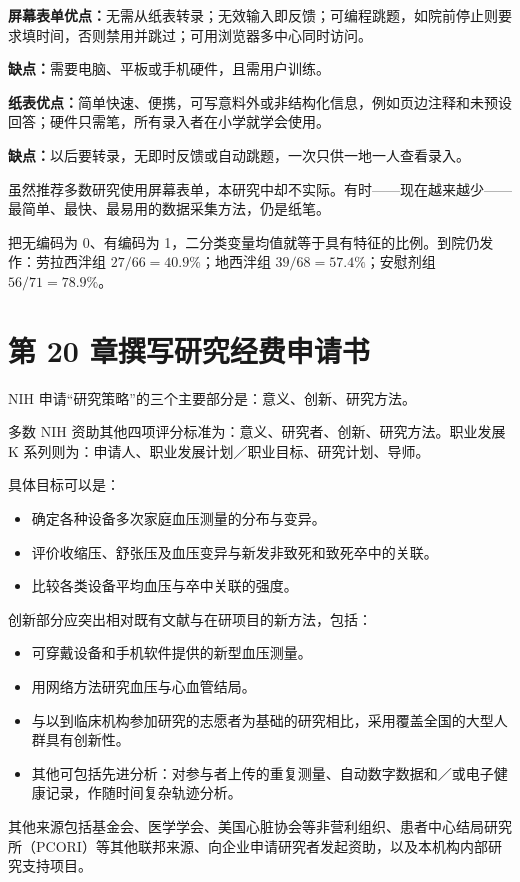 \begin{answerlist}
\item[1c.] \textbf{屏幕表单优点：}无需从纸表转录；无效输入即反馈；可编程跳题，如院前停止则要求填时间，否则禁用并跳过；可用浏览器多中心同时访问。

\textbf{缺点：}需要电脑、平板或手机硬件，且需用户训练。

\textbf{纸表优点：}简单快速、便携，可写意料外或非结构化信息，例如页边注释和未预设回答；硬件只需笔，所有录入者在小学就学会使用。

\textbf{缺点：}以后要转录，无即时反馈或自动跳题，一次只供一地一人查看录入。

虽然推荐多数研究使用屏幕表单，本研究中却不实际。有时——现在越来越少——最简单、最快、最易用的数据采集方法，仍是纸笔。
\item[2.] 把无编码为 0、有编码为 1，二分类变量均值就等于具有特征的比例。到院仍发作：劳拉西泮组 $27/66=40.9\%$；地西泮组 $39/68=57.4\%$；安慰剂组 $56/71=78.9\%$。
\end{answerlist}

\section{第 20 章\quad 撰写研究经费申请书}
\begin{answerlist}
\item[1.] NIH 申请“研究策略”的三个主要部分是：意义、创新、研究方法。
\item[2.] 多数 NIH 资助其他四项评分标准为：意义、研究者、创新、研究方法。职业发展 K 系列则为：申请人、职业发展计划／职业目标、研究计划、导师。
\item[3a.] 具体目标可以是：
\begin{itemize}
\item 确定各种设备多次家庭血压测量的分布与变异。
\item 评价收缩压、舒张压及血压变异与新发非致死和致死卒中的关联。
\item 比较各类设备平均血压与卒中关联的强度。
\end{itemize}
\item[3b.] 创新部分应突出相对既有文献与在研项目的新方法，包括：
\begin{itemize}
\item 可穿戴设备和手机软件提供的新型血压测量。
\item 用网络方法研究血压与心血管结局。
\item 与以到临床机构参加研究的志愿者为基础的研究相比，采用覆盖全国的大型人群具有创新性。
\item 其他可包括先进分析：对参与者上传的重复测量、自动数字数据和／或电子健康记录，作随时间复杂轨迹分析。
\end{itemize}
\item[4.] 其他来源包括基金会、医学学会、美国心脏协会等非营利组织、患者中心结局研究所（PCORI）等其他联邦来源、向企业申请研究者发起资助，以及本机构内部研究支持项目。
\end{answerlist}
